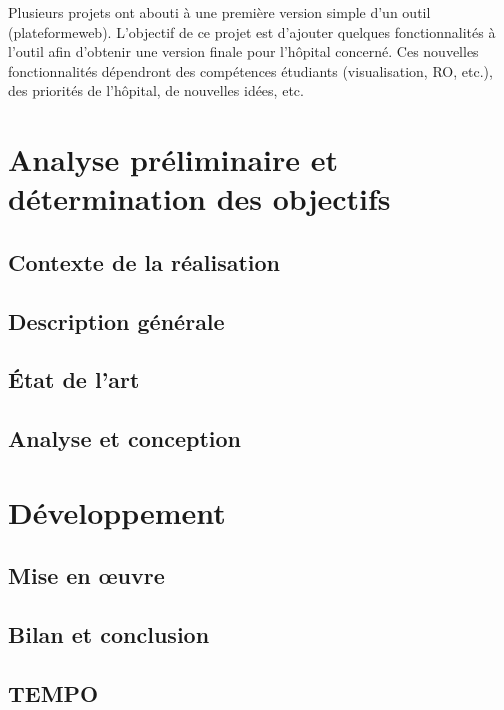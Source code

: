 \documentclass{polytech/polytech}
\begin{document}
Plusieurs projets ont abouti à une première version simple d’un outil (plateformeweb). L’objectif de ce projet est d’ajouter quelques fonctionnalités à l'outil afin d’obtenir une version finale pour l’hôpital concerné. Ces nouvelles fonctionnalités dépendront des compétences étudiants (visualisation, RO, etc.), des priorités de l’hôpital, de nouvelles idées, etc.


\part{Analyse préliminaire et détermination des objectifs}


\chapter{Contexte de la réalisation}


\chapter{Description générale}


\chapter{État de l'art}


\chapter{Analyse et conception}


\part{Développement}


\chapter{Mise en œuvre}


\chapter{Bilan et conclusion}


\chapter*{TEMPO}
\end{document}

